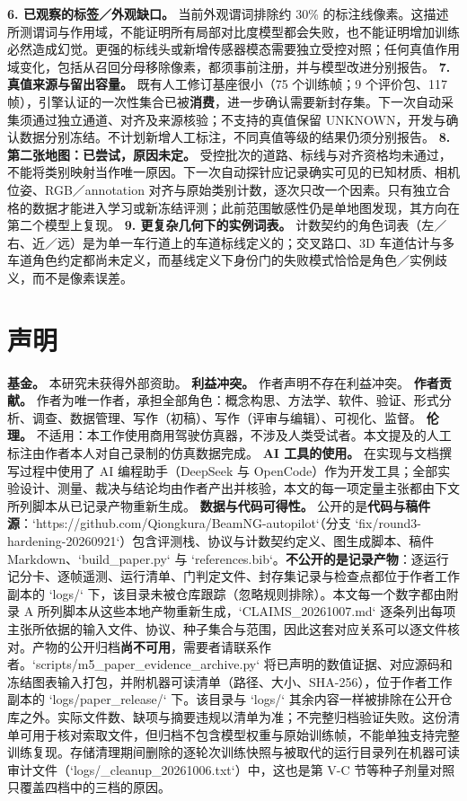 \documentclass[journal]{IEEEtran}
\begin{document}
\textbf{6. 已观察的标签／外观缺口。} 当前外观谓词排除约 30\% 的标注线像素。这描述所测谓词与作用域，不能证明所有局部对比度模型都会失败，也不能证明增加训练必然造成幻觉。更强的标线头或新增传感器模态需要独立受控对照；任何真值作用域变化，包括从召回分母移除像素，都须事前注册，并与模型改进分别报告。
\textbf{7. 真值来源与留出容量。} 既有人工修订基座很小（75 个训练帧；9 个评价包、117 帧），引擎认证的一次性集合已被\textbf{消费}，进一步确认需要新封存集。下一次自动采集须通过独立通道、对齐及来源核验；不支持的真值保留 UNKNOWN，开发与确认数据分别冻结。不计划新增人工标注，不同真值等级的结果仍须分别报告。
\textbf{8. 第二张地图：已尝试，原因未定。} 受控批次的道路、标线与对齐资格均未通过，不能将类别映射当作唯一原因。下一次自动探针应记录确实可见的已知材质、相机位姿、RGB／annotation 对齐与原始类别计数，逐次只改一个因素。只有独立合格的数据才能进入学习或新冻结评测；此前范围敏感性仍是单地图发现，其方向在第二个模型上复现。
\textbf{9. 更复杂几何下的实例词表。} 计数契约的角色词表（左／右、近／远）是为单一车行道上的车道标线定义的；交叉路口、3D 车道估计与多车道角色约定都尚未定义，而基线定义下身份门的失败模式恰恰是角色／实例歧义，而不是像素误差。
\section*{声明}
\textbf{基金。} 本研究未获得外部资助。
\textbf{利益冲突。} 作者声明不存在利益冲突。
\textbf{作者贡献。} 作者为唯一作者，承担全部角色：概念构思、方法学、软件、验证、形式分析、调查、数据管理、写作（初稿）、写作（评审与编辑）、可视化、监督。
\textbf{伦理。} 不适用：本工作使用商用驾驶仿真器，不涉及人类受试者。本文提及的人工标注由作者本人对自己录制的仿真数据完成。
\textbf{AI 工具的使用。} 在实现与文档撰写过程中使用了 AI 编程助手（DeepSeek 与 OpenCode）作为开发工具；全部实验设计、测量、裁决与结论均由作者产出并核验，本文的每一项定量主张都由下文所列脚本从已记录产物重新生成。
\textbf{数据与代码可得性。} 公开的是\textbf{代码与稿件源}：`https://github.com/Qiongkura/BeamNG-autopilot`（分支 `fix/round3-hardening-20260921`）包含评测栈、协议与计数契约定义、图生成脚本、稿件 Markdown、`build_paper.py` 与 `references.bib`。\textbf{不公开的是记录产物}：逐运行记分卡、逐帧遥测、运行清单、门判定文件、封存集记录与检查点都位于作者工作副本的 `logs/` 下，该目录未被仓库跟踪（忽略规则排除）。本文每一个数字都由附录 A 所列脚本从这些本地产物重新生成，`CLAIMS_20261007.md` 逐条列出每项主张所依据的输入文件、协议、种子集合与范围，因此这套对应关系可以逐文件核对。产物的公开归档\textbf{尚不可用}，需要者请联系作者。`scripts/m5_paper_evidence_archive.py` 将已声明的数值证据、对应源码和冻结图表输入打包，并附机器可读清单（路径、大小、SHA-256），位于作者工作副本的 `logs/paper_release/` 下。该目录与 `logs/` 其余内容一样被排除在公开仓库之外。实际文件数、缺项与摘要违规以清单为准；不完整归档验证失败。这份清单可用于核对索取文件，但归档不包含模型权重与原始训练帧，不能单独支持完整训练复现。存储清理期间删除的逐轮次训练快照与被取代的运行目录列在机器可读审计文件（`logs/_cleanup_20261006.txt`）中，这也是第 V-C 节等种子剂量对照只覆盖四档中的三档的原因。
\end{document}
